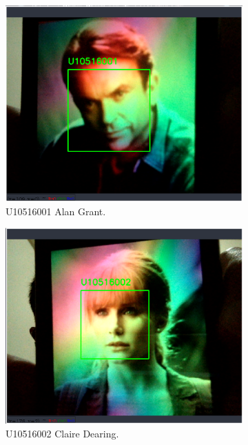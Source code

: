 \documentclass[14pt]{report}
\begin{document}
\begin{figure}[h!]
  \centering
  \begin{subfigure}[b]{0.32\linewidth}
    \includegraphics[width=\linewidth]{figures/exp01.eps}
    \caption{U10516001 Alan Grant.}
  \end{subfigure}
  \begin{subfigure}[b]{0.32\linewidth}
    \includegraphics[width=\linewidth]{figures/exp02.eps}
    \caption{U10516002 Claire Dearing.}
  \end{subfigure}
  \begin{subfigure}[b]{0.32\linewidth}

\end{subfigure}
\end{figure}
\end{document}
